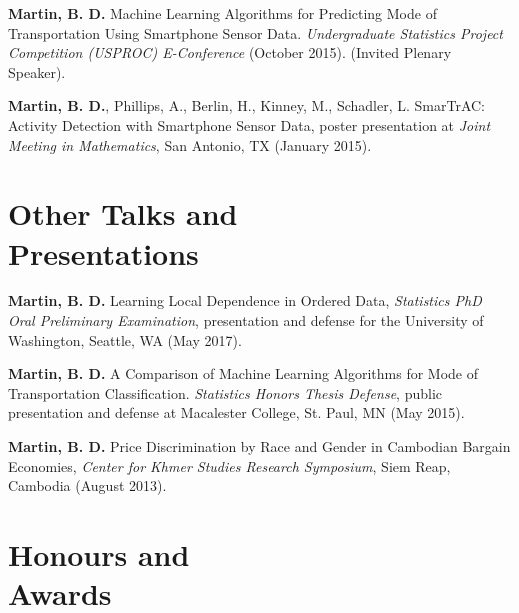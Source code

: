 \documentclass[margin,centered]{res}
\begin{document}
\begin{resume}
\textbf{Martin, B. D.} Machine Learning Algorithms for Predicting Mode of Transportation Using Smartphone Sensor Data. \textit{Undergraduate Statistics Project Competition (USPROC) E-Conference} (October 2015). (Invited Plenary Speaker).

\textbf{Martin, B. D.}, Phillips, A., Berlin, H., Kinney, M., Schadler, L. SmarTrAC: Activity Detection with Smartphone Sensor Data, poster presentation at \textit{Joint Meeting in Mathematics}, San Antonio, TX (January 2015). 


\section{\sc Other Talks and \\ Presentations}


\textbf{Martin, B. D.} Learning Local Dependence in Ordered Data, \emph{Statistics PhD Oral Preliminary Examination}, presentation and defense for the University of Washington, Seattle, WA (May 2017).

\textbf{Martin, B. D.} A Comparison of Machine Learning Algorithms for Mode of Transportation Classification. \emph{Statistics Honors Thesis Defense}, public presentation and defense at Macalester College, St. Paul, MN (May 2015).



\textbf{Martin, B. D.} Price Discrimination by Race and Gender in Cambodian Bargain Economies, \textit{Center for Khmer Studies Research Symposium}, Siem Reap, Cambodia (August 2013).



\section{\sc Honours and\\ Awards}


\end{resume}
\end{document}

